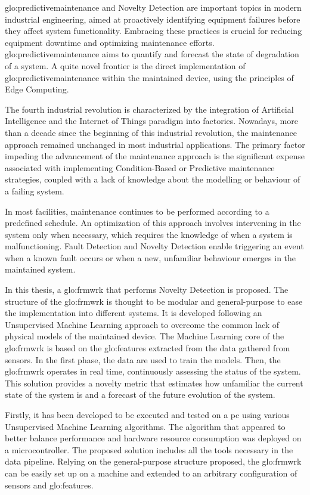 \gls{glo:predictivemaintenance} and Novelty Detection are important topics in modern industrial engineering, aimed at proactively identifying equipment failures before they affect system functionality. Embracing these practices is crucial for reducing equipment downtime and optimizing maintenance efforts. \gls{glo:predictivemaintenance} aims to quantify and forecast the state of degradation of a system. A quite novel frontier is the direct implementation of \gls{glo:predictivemaintenance} within the maintained device, using the principles of Edge Computing.

The fourth industrial revolution is characterized by the integration of Artificial Intelligence and the Internet of Things paradigm into factories. Nowadays, more than a decade since the beginning of this industrial revolution, the maintenance approach remained unchanged in most industrial applications. The primary factor impeding the advancement of the maintenance approach is the significant expense associated with implementing Condition-Based or Predictive maintenance strategies, coupled with a lack of knowledge about the modelling or behaviour of a failing system.

In most facilities, maintenance continues to be performed according to a predefined schedule. An optimization of this approach involves intervening in the system only when necessary, which requires the knowledge of when a system is malfunctioning. Fault Detection and Novelty Detection enable triggering an event when a known fault occurs or when a new, unfamiliar behaviour emerges in the maintained system. 

In this thesis, a \gls{glo:frmwrk} that performs Novelty Detection is proposed. The structure of the \gls{glo:frmwrk} is thought to be modular and general-purpose to ease the implementation into different systems. It is developed following an Unsupervised Machine Learning approach to overcome the common lack of physical models of the maintained device. The Machine Learning core of the \gls{glo:frmwrk} is based on the \gls{glo:feature}s extracted from the data gathered from sensors. In the first phase, the data are used to train the models. Then, the \gls{glo:frmwrk} operates in real time, continuously assessing the status of the system. This solution provides a novelty metric that estimates how unfamiliar the current state of the system is and a forecast of the future evolution of the system.

Firstly, it has been developed to be executed and tested on a \gls{pc} using various Unsupervised Machine Learning algorithms. The algorithm that appeared to better balance performance and hardware resource consumption was deployed on a microcontroller. The proposed solution includes all the tools necessary in the data pipeline. Relying on the general-purpose structure proposed, the \gls{glo:frmwrk} can be easily set up on a machine and extended to an arbitrary configuration of sensors and \gls{glo:feature}s. 


